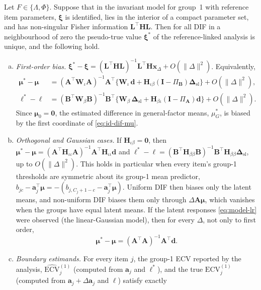 \begin{theorem}\label{thm:dif-bias}
Let $F\in\{\Lambda,\Phi\}$. Suppose that in the invariant model for group~1 with reference item parameters, $\bm\xi$ is identified, lies in the interior of a compact parameter set, and has non-singular Fisher information $\bm L^\top\bm H\bm L$. Then for all DIF in a neighbourhood of zero the pseudo-true value $\bm\xi^*$ of the reference-linked analysis is unique, and the following hold.
\begin{enumerate}[(a)]
  \item \emph{First-order bias.} $\bm\xi^*-\bm\xi=(\bm L^\top\bm H\bm L)^{-1}\bm L^\top\bm H\bm x_\Delta+O(\|\Delta\|^2)$. Equivalently,
  \begin{align}
    \bm\mu^*-\bm\mu&=(\bm A^\top\bm W_\iota\bm A)^{-1}\bm A^\top\bigl\{\bm W_\iota\,\bm d+\bm H_{\iota\beta}(\bm I-\Pi_{\bm B})\bm\Delta_{\mathrm{sl}}\bigr\}+O(\|\Delta\|^2),\label{eq:id-dif-mu}\\
    \bm\ell^*-\bm\ell&=(\bm B^\top\bm W_\beta\bm B)^{-1}\bm B^\top\bigl\{\bm W_\beta\,\bm\Delta_{\mathrm{sl}}+\bm H_{\beta\iota}(\bm I-\Pi_{\bm A})\bm d\bigr\}+O(\|\Delta\|^2).\label{eq:id-dif-ell}
  \end{align}
  Since $\bm\mu_0=\bm0$, the estimated difference in general-factor means, $\mu^*_G$, is biased by the first coordinate of \eqref{eq:id-dif-mu}.
  \item \emph{Orthogonal and Gaussian cases.} If $\bm H_{\iota\beta}=\bm0$, then $\bm\mu^*-\bm\mu=(\bm A^\top\bm H_{\iota\iota}\bm A)^{-1}\bm A^\top\bm H_{\iota\iota}\bm d$ and $\bm\ell^*-\bm\ell=(\bm B^\top\bm H_{\beta\beta}\bm B)^{-1}\bm B^\top\bm H_{\beta\beta}\bm\Delta_{\mathrm{sl}}$, up to $O(\|\Delta\|^2)$. This holds in particular when every item's group-1 thresholds are symmetric about its group-1 mean predictor, $b_{jc}-\bm a_j^\top\bm\mu=-(b_{j,C_j+1-c}-\bm a_j^\top\bm\mu)$. Uniform DIF then biases only the latent means, and non-uniform DIF biases them only through $\Delta\bm A\bm\mu$, which vanishes when the groups have equal latent means. If the latent responses \eqref{eq:model-lr} were observed (the linear-Gaussian model), then for every $\Delta$, not only to first order,
  \begin{equation}\label{eq:id-dif-gauss}
    \bm\mu^*-\bm\mu=(\bm A^\top\bm A)^{-1}\bm A^\top\bm d .
  \end{equation}
  \item \emph{Boundary estimands.} For every item $j$, the group-1 ECV reported by the analysis, $\widehat{\mathrm{ECV}}{}^{(1)}_j$ (computed from $\bm a_j$ and $\bm\ell^*$), and the true $\mathrm{ECV}^{(1)}_j$ (computed from $\bm a_j+\Delta\bm a_j$ and $\bm\ell$) satisfy exactly

\end{enumerate}
\end{theorem}
